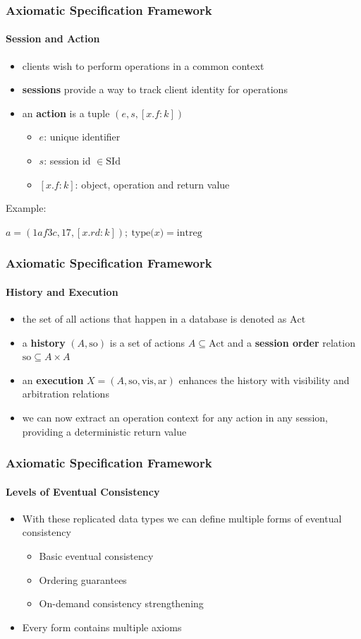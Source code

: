 \documentclass[11pt]{beamer}
\begin{document}
\begin{frame}
\frametitle{Axiomatic Specification Framework}
\framesubtitle{Session and Action}
\begin{itemize}
\item clients wish to perform operations in a common context
\item \textbf{sessions} provide a way to track client identity for operations
\item an \textbf{action} is a tuple \((e,s,[x.f:k])\)
\begin{itemize}
\item \(e\): unique identifier
\item \(s\): session id \(\in \mathrm{SId}\)
\item \([x.f:k]\): object, operation and return value
\end{itemize}
\end{itemize}
\pause
Example:

\begin{center}
\(a = (1af3c, 17, [x.rd: k]);\ \mathrm{type(}x\mathrm{)} = \mathrm{intreg}\)
\end{center}
\end{frame}

\begin{frame}
\frametitle{Axiomatic Specification Framework}
\framesubtitle{History and Execution}
\begin{itemize}
\item the set of all actions that happen in a database is denoted as \(\mathrm{Act}\)
\item a \textbf{history} \((A,\mathrm{so})\) is a set of actions \(A \subseteq \mathrm{Act}\) and a \textbf{session order} relation \(\mathrm{so} \subseteq A \times A \)
\item an \textbf{execution} \(X = (A, \mathrm{so, vis, ar})\) enhances the history with visibility and arbitration relations
\item we can now extract an operation context for any action in any session, providing a deterministic return value
\end{itemize}

\end{frame}

\begin{frame}
\frametitle{Axiomatic Specification Framework}
\framesubtitle{Levels of Eventual Consistency}
\begin{itemize}
\item With these replicated data types we can define multiple forms of eventual consistency
\begin{itemize}
\item Basic eventual consistency
\item Ordering guarantees
\item On-demand consistency strengthening
\end{itemize}
\item Every form contains multiple axioms
\end{itemize}
\end{frame}
\end{document}
